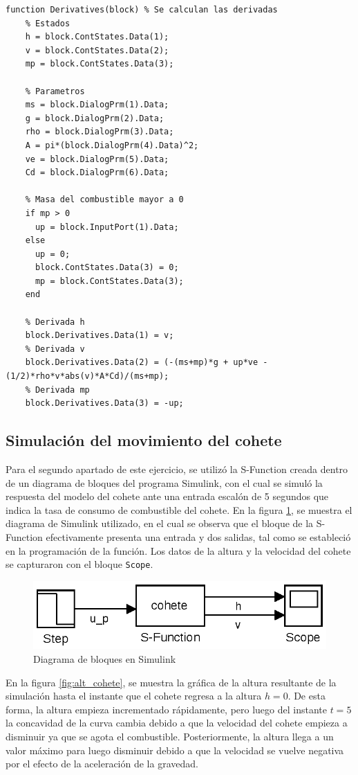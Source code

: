 \documentclass[12pt,letterpaper]{article}
\begin{document}
\begin{lstlisting}[style=Matlab-editor, basicstyle=\mlttfamily]
  function Derivatives(block) % Se calculan las derivadas
    % Estados
    h = block.ContStates.Data(1);
    v = block.ContStates.Data(2);
    mp = block.ContStates.Data(3);

    % Parametros
    ms = block.DialogPrm(1).Data;
    g = block.DialogPrm(2).Data;
    rho = block.DialogPrm(3).Data;
    A = pi*(block.DialogPrm(4).Data)^2;
    ve = block.DialogPrm(5).Data;
    Cd = block.DialogPrm(6).Data;

    % Masa del combustible mayor a 0
    if mp > 0
      up = block.InputPort(1).Data;
    else
      up = 0;
      block.ContStates.Data(3) = 0;
      mp = block.ContStates.Data(3);
    end

    % Derivada h
    block.Derivatives.Data(1) = v;
    % Derivada v
    block.Derivatives.Data(2) = (-(ms+mp)*g + up*ve -(1/2)*rho*v*abs(v)*A*Cd)/(ms+mp);
    % Derivada mp
    block.Derivatives.Data(3) = -up;     
\end{lstlisting}


\subsection{Simulación del movimiento del cohete}
Para el segundo apartado de este ejercicio, se utilizó la S-Function creada dentro de un diagrama de
bloques del programa Simulink, con el cual se simuló la respuesta del modelo del cohete ante una
entrada escalón de 5 segundos que indica la tasa de consumo de combustible del cohete. En la figura
\ref{fig:diag_simulink}, se muestra el diagrama de Simulink utilizado, en el cual se observa que el
bloque de la S-Function efectivamente presenta una entrada y dos salidas, tal como se estableció en
la programación de la función. Los datos de la altura y la velocidad del cohete se capturaron con el
bloque \texttt{Scope}.

\begin{figure}[ht!]
  \centering
  \includegraphics[width=0.5\linewidth]{pictures/Ejercicio3/simulink_cohete.eps}
  \caption{Diagrama de bloques en Simulink}
  \label{fig:diag_simulink}
\end{figure}

En la figura \ref{fig:alt_cohete}, se muestra la gráfica de la altura resultante de la simulación
hasta el instante que el cohete regresa a la altura $h=0$. De esta forma, la altura empieza
incrementado rápidamente, pero luego del instante $t=5$ la concavidad de la curva cambia debido a
que la velocidad del cohete empieza a disminuir ya que se agota el combustible. Posteriormente, la
altura llega a un valor máximo para luego disminuir debido a que la velocidad se vuelve negativa por
el efecto de la aceleración de la gravedad.
\end{document}
